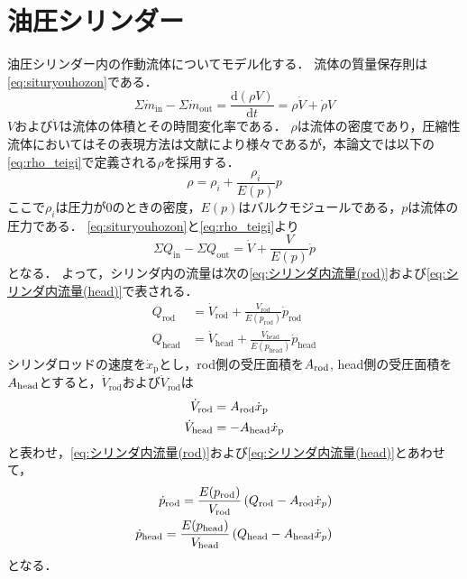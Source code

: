 \section{油圧シリンダー}
油圧シリンダー内の作動流体についてモデル化する．
流体の質量保存則は\eqnname\eqref{eq:situryouhozon}である．
\begin{equation}
    \label{eq:situryouhozon}
\Sigma \dot{m}_{\mathrm{in}}-\Sigma \dot{m}_{\mathrm{out}} = \frac{\mathrm{d}(\rho V)}{\mathrm{d}t} = \rho \dot{V}+\dot{\rho}V
\end{equation}
$V$および$\dot{V}$は流体の体積とその時間変化率である．
$\rho$は流体の密度であり，圧縮性流体においてはその表現方法は文献により様々であるが，本論文では以下の\eqnname\eqref{eq:rho_teigi}で定義される$\rho$を採用する．
\begin{equation}
    \label{eq:rho_teigi}
    \rho = \rho_i + \frac{\rho_i}{E(p)}p
\end{equation}
ここで$\rho_i$は圧力が0のときの密度，$E(p)$はバルクモジュールである，$p$は流体の圧力である．
\eqnname\eqref{eq:situryouhozon}と\eqnname\eqref{eq:rho_teigi}より
\begin{equation}
    \label{eq:流量保存}
    \Sigma Q_{\mathrm{in}} - \Sigma Q_{\mathrm{out}} = \dot{V} + \frac{V}{E(p)}\dot{p}
\end{equation}
となる．
よって，シリンダ内の流量は次の\eqnname\eqref{eq:シリンダ内流量(rod)}および\eqnname\eqref{eq:シリンダ内流量(head)}で表される．
\begin{align}
    \label{eq:シリンダ内流量(rod)}
    Q_{\mathrm{rod}}& = \dot{V}_\mathrm{rod} + \frac{V_\mathrm{rod}}{E(p_\mathrm{rod})}\dot{p}_\mathrm{rod}\\
    \label{eq:シリンダ内流量(head)}
    Q_{\mathrm{head}} &= \dot{V}_\mathrm{head} + \frac{V_\mathrm{head}}{E(p_\mathrm{head})}\dot{p}_\mathrm{head}
\end{align}
シリンダロッドの速度を$\dot{x}_\mathrm{p}$とし，rod側の受圧面積を$A_\mathrm{rod}$,
head側の受圧面積を$A_\mathrm{head}$とすると，$\dot{V}_\mathrm{rod}$および$\dot{V}_\mathrm{rod}$は
\begin{align}
    \label{eq:dotVrod}
    \dot{V}_\mathrm{rod} &= A_\mathrm{rod} \dot{x}_\mathrm{p} \\
    \label{eq:dotVhead}
    \dot{V}_\mathrm{head} &= -A_\mathrm{head} \dot{x}_\mathrm{p} 
\end{align}
と表わせ，\eqnname\eqref{eq:シリンダ内流量(rod)}および\eqnname\eqref{eq:シリンダ内流量(head)}とあわせて，
\begin{align}
    \label{eq:dp_rod}
    \dot{p}_\mathrm{rod}=\frac{E(p_\mathrm{rod})}{V_\mathrm{rod}}\left( Q_\mathrm{rod} - A_\mathrm{rod} \dot{x}_p\right)\\
    \label{eq:dp_head}
    \dot{p}_\mathrm{head}=\frac{E(p_\mathrm{head})}{V_\mathrm{head}} \left( Q_\mathrm{head} - A_\mathrm{head} \dot{x}_p \right)
\end{align}
となる．

